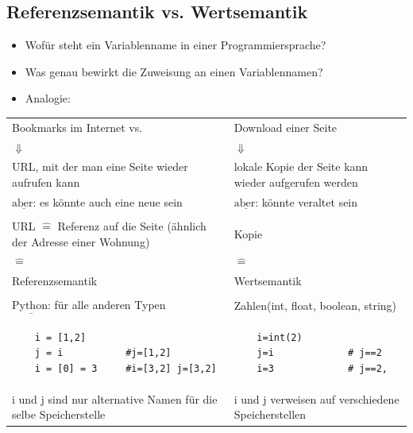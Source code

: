 \subsection*{Referenzsemantik vs. Wertsemantik}
    \begin{itemize}[label={-}]
        \item Wofür steht ein Variablenname in einer Programmiersprache?
        \item Was genau bewirkt die Zuweisung an einen Variablennamen?
        \item Analogie:
    \end{itemize}
    \begin{tabular}{C{7cm} C{7cm}}
    Bookmarks im Internet \hspace*{1cm}vs. &  Download einer Seite \\
    $\Downarrow$ & $\Downarrow$ \\
    URL, mit der man eine Seite wieder aufrufen kann & lokale Kopie der Seite
    kann wieder aufgerufen werden \\
    $\underline{\text{aber:}}$ es könnte auch eine neue sein & $\underline{\text{aber:}}$ könnte veraltet sein \\
    & \\
    URL $\widehat{=}$ Referenz auf die Seite (ähnlich der Adresse einer Wohnung) & Kopie \\
    $\widehat{=}$ & $\widehat{=}$ \\
    Referenzsemantik & Wertsemantik \\
     & \\
    $ \underline{\text{Python:}}$ für alle anderen Typen & Zahlen(int, float, boolean, string)\\
    \begin{verbatim}
    i = [1,2]
    j = i           #j=[1,2]
    i = [0] = 3     #i=[3,2] j=[3,2]
    \end{verbatim}
                                                         &
    \begin{verbatim}
    i=int(2)
    j=i             # j==2
    i=3             # j==2,
    \end{verbatim}
    \\
    i und j sind nur alternative Namen für die selbe Speicherstelle & i und j verweisen auf verschiedene Speicherstellen \\
    \end{tabular}




